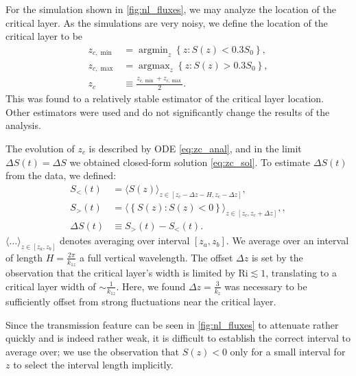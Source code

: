 \documentclass[
        fleqn,
        usenatbib,
    ]{mnras}
\newcommand*{\ev}[1]{\langle#1\rangle}
\newcommand*{\z}[1]{\left\{#1\right\}}
\DeclareMathOperator*{\argmin}{argmin}
\DeclareMathOperator*{\argmax}{argmax}
\begin{document}
For the simulation shown in \autoref{fig:nl_fluxes}, we may analyze the location
of the critical layer. As the simulations are very noisy, we define the location
of the critical layer to be
\begin{align}
    z_{c, \min} &= \argmin_z \z{z: S(z) < 0.3S_0},\nonumber\\
    z_{c, \max} &= \argmax_z \z{z: S(z) > 0.3S_0},\nonumber\\
    z_c &\equiv \frac{z_{c, \min} + z_{c, \max}}{2}.\label{eq:zc_def}
\end{align}
This was found to a relatively stable estimator of the critical layer location.
Other estimators were used and do not significantly change the results of the
analysis.

The evolution of $z_c$ is described by ODE \autoref{eq:zc_anal}, and in the
limit $\Delta S(t) = \Delta S$ we obtained closed-form solution
\autoref{eq:zc_sol}. To estimate $\Delta S(t)$ from the data, we defined:
\begin{align}
    S_{<}(t) &= \ev{S(z)}_{z \in [z_c - \Delta z - H, z_c - \Delta z]}
        ,\label{eq:sbelow_def}\\
    S_>(t) &= \ev{\z{S(z): S(z) < 0}}_{z \in [z_c, z_c + \Delta z]},
        \label{eq:sabove_def},\\
    \Delta S(t) &\equiv S_>(t) - S_{<}(t).\label{eq:ds_def}
\end{align}
$\ev{\dots}_{z \in [z_a, z_b]}$ denotes averaging over interval $[z_a, z_b]$.
We average over an interval of length $H = \frac{2\pi}{k_{1z}}$ a full vertical
wavelength. The offset $\Delta z$ is set by the observation that the critical
layer's width is limited by $\mathrm{Ri} \lesssim 1$, translating to a critical
layer width of $\sim \frac{1}{k_{1z}}$. Here, we found $\Delta z =
\frac{3}{k_z}$ was necessary to be sufficiently offset from strong fluctuations
near the critical layer.

Since the transmission feature can be seen in \autoref{fig:nl_fluxes} to
attenuate rather quickly and is indeed rather weak, it is difficult to establish
the correct interval to average over; we use the observation that $S(z) < 0$
only for a small interval for $z$ to select the interval length implicitly.
\end{document}
